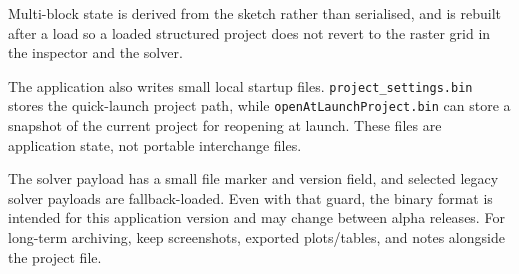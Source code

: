 \documentclass[11pt]{article}
\begin{document}
Multi-block state is derived from the sketch rather than serialised, and is rebuilt after
a load so a loaded structured project does not revert to the raster grid in the inspector
and the solver.

The application also writes small local startup files. \texttt{project\_settings.bin}
stores the quick-launch project path, while \texttt{openAtLaunchProject.bin} can store
a snapshot of the current project for reopening at launch. These files are application
state, not portable interchange files.

The solver payload has a small file marker and version field, and selected legacy solver
payloads are fallback-loaded. Even with that guard, the binary format is intended for
this application version and may change between alpha releases. For long-term archiving,
keep screenshots, exported plots/tables, and notes alongside the project file.

\end{document}

